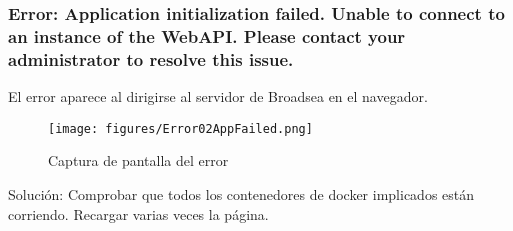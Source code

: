 \subsubsection{Error: Application initialization failed. Unable to connect to an instance of the WebAPI. Please contact your administrator to resolve this issue.}

El error aparece al dirigirse al servidor de Broadsea en el navegador.

\begin{figure}[H]
    \centering
    \texttt{[image: figures/Error02AppFailed.png]}
     \caption{Captura de pantalla del error}
    \label{fig:Error02AppFailed}
\end{figure}

Solución: Comprobar que todos los contenedores de docker implicados están corriendo. Recargar varias veces la página.


